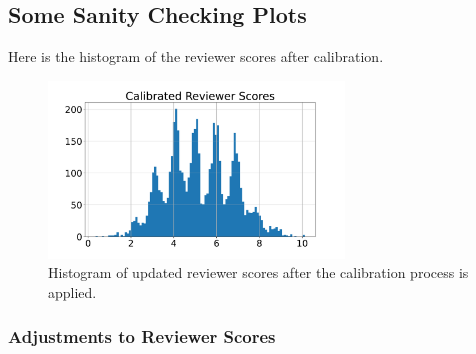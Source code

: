 \hypertarget{some-sanity-checking-plots}{%
\subsection{Some Sanity Checking
Plots}\label{some-sanity-checking-plots}}

\begin{flushright}
\end{flushright}

Here is the histogram of the reviewer scores after calibration.

\begin{Shaded}
\begin{Highlighting}[]
\OperatorTok{=}\OperatorTok{=}
\OperatorTok{=}\OperatorTok{=}
\NormalTok{\_ }\OperatorTok{=}\NormalTok{)}
\OperatorTok{=}\OperatorTok{=}\NormalTok{)}
\end{Highlighting}
\end{Shaded}

\begin{figure}[htb]
\includegraphics[width=0.70\textwidth]{diagrams/neurips/calibrated-reviewer-scores.pdf}


\caption{Histogram of updated reviewer scores after the calibration process is applied.}
\label{calibrated-reviewer-scores}
\end{figure}

\hypertarget{adjustments-to-reviewer-scores}{%
\subsubsection{Adjustments to Reviewer
Scores}\label{adjustments-to-reviewer-scores}}

